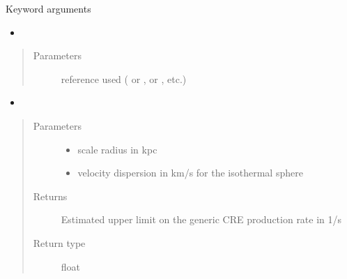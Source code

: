 \documentclass[letterpaper,10pt,english]{sphinxmanual}
\begin{document}
\begin{fulllineitems}
\begin{quote}
\begin{description}
\end{description}\end{quote}

\sphinxAtStartPar
Keyword arguments
\begin{itemize}
\item {} 
\sphinxAtStartPar
{}

\end{itemize}
\begin{quote}\begin{description}
\item[{Parameters}] \leavevmode
\sphinxAtStartPar
{} \textendash{} reference used ( or \sphinxcode{\sphinxupquote{\textquotesingle{}1309.2641\textquotesingle{}}},  or \sphinxcode{\sphinxupquote{\textquotesingle{}1408.0002\textquotesingle{}}}, etc.)

\end{description}\end{quote}
\begin{itemize}
\item {} 
\sphinxAtStartPar
{}

\end{itemize}
\begin{quote}\begin{description}
\item[{Parameters}] \leavevmode\begin{itemize}
\item {} 
\sphinxAtStartPar
{} \textendash{} scale radius in kpc

\item {} 
\sphinxAtStartPar
{} \textendash{} velocity dispersion in km/s for the isothermal sphere {\hyperref[\detokenize{diffsph.profiles:diffsph.profiles.templates.sis}]{}}

\end{itemize}

\item[{Returns}] \leavevmode
\sphinxAtStartPar
Estimated upper limit on the generic CRE production rate in 1/s

\item[{Return type}] \leavevmode
\sphinxAtStartPar
float

\end{description}\end{quote}

\end{fulllineitems}
\end{document}
